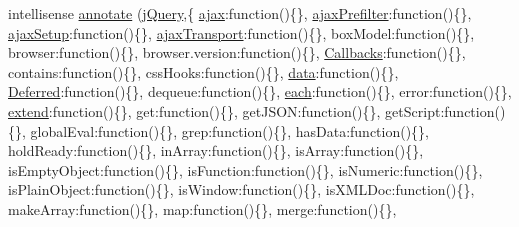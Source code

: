 \begin{DoxyCompactItemize}
\item 
intellisense \hyperlink{jquery-1_810_82_8intellisense_8js_ad1527630d45bb696c9bc5e21e4bd7355}{annotate} (\hyperlink{_scripts_2jquery-1_810_82_8js_a5e01048fbd3a30b44e8d491d8945c457}{j\+Query},\{ \textquotesingle{}\hyperlink{_scripts_2jquery_8validate_8js_a77004c0fdc08a5bc07afa0b099cdf6df}{ajax}\textquotesingle{}\+:function()\{\}, \textquotesingle{}\hyperlink{_scripts_2jquery-1_810_82_8js_a144939e373cc1ad511a53c4251ec7ffa}{ajax\+Prefilter}\textquotesingle{}\+:function()\{\}, \textquotesingle{}\hyperlink{_scripts_2jquery-1_810_82_8js_a52a40924d02e0d9756f051e36a640cd6}{ajax\+Setup}\textquotesingle{}\+:function()\{\}, \textquotesingle{}\hyperlink{_scripts_2jquery-1_810_82_8js_aa4b3cc72f61c03cca7a223e4c552f80f}{ajax\+Transport}\textquotesingle{}\+:function()\{\}, \textquotesingle{}box\+Model\textquotesingle{}\+:function()\{\}, \textquotesingle{}browser\textquotesingle{}\+:function()\{\}, \textquotesingle{}browser.\+version\textquotesingle{}\+:function()\{\}, \textquotesingle{}\hyperlink{jquery-1_810_82_8intellisense_8js_add8d59d25831bb9b171fdbee8a18795b}{Callbacks}\textquotesingle{}\+:function()\{\}, \textquotesingle{}contains\textquotesingle{}\+:function()\{\}, \textquotesingle{}css\+Hooks\textquotesingle{}\+:function()\{\}, \textquotesingle{}\hyperlink{jquery_8unobtrusive-ajax_8min_8js_a8f172ae31c11770303ca0c4cb48ceb3a}{data}\textquotesingle{}\+:function()\{\}, \textquotesingle{}\hyperlink{jquery-1_810_82_8intellisense_8js_ab355ffd82371d88c17da7c1dae9e8829}{Deferred}\textquotesingle{}\+:function()\{\}, \textquotesingle{}dequeue\textquotesingle{}\+:function()\{\}, \textquotesingle{}\hyperlink{_scripts_2jquery-1_810_82_8min_8js_af24c9ea1e34372f8c8b312b35586008d}{each}\textquotesingle{}\+:function()\{\}, \textquotesingle{}error\textquotesingle{}\+:function()\{\}, \textquotesingle{}\hyperlink{_scripts_2jquery_8validate_8js_ad61761890153db212680dde01cbd42f9}{extend}\textquotesingle{}\+:function()\{\}, \textquotesingle{}get\textquotesingle{}\+:function()\{\}, \textquotesingle{}get\+J\+S\+O\+N\textquotesingle{}\+:function()\{\}, \textquotesingle{}get\+Script\textquotesingle{}\+:function()\{\}, \textquotesingle{}global\+Eval\textquotesingle{}\+:function()\{\}, \textquotesingle{}grep\textquotesingle{}\+:function()\{\}, \textquotesingle{}has\+Data\textquotesingle{}\+:function()\{\}, \textquotesingle{}hold\+Ready\textquotesingle{}\+:function()\{\}, \textquotesingle{}in\+Array\textquotesingle{}\+:function()\{\}, \textquotesingle{}is\+Array\textquotesingle{}\+:function()\{\}, \textquotesingle{}is\+Empty\+Object\textquotesingle{}\+:function()\{\}, \textquotesingle{}is\+Function\textquotesingle{}\+:function()\{\}, \textquotesingle{}is\+Numeric\textquotesingle{}\+:function()\{\}, \textquotesingle{}is\+Plain\+Object\textquotesingle{}\+:function()\{\}, \textquotesingle{}is\+Window\textquotesingle{}\+:function()\{\}, \textquotesingle{}is\+X\+M\+L\+Doc\textquotesingle{}\+:function()\{\}, \textquotesingle{}make\+Array\textquotesingle{}\+:function()\{\}, \textquotesingle{}map\textquotesingle{}\+:function()\{\}, \textquotesingle{}merge\textquotesingle{}\+:function()\{\}, 
\end{DoxyCompactItemize}
